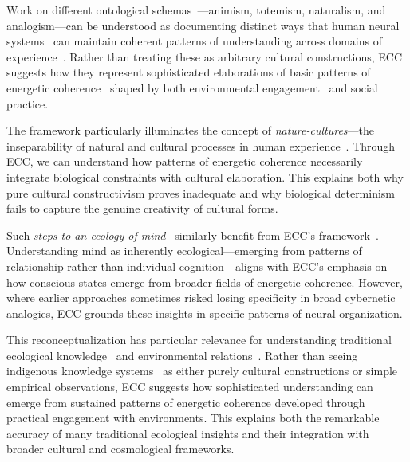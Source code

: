 Work on different ontological schemas~—animism, totemism, naturalism, and analogism—can be understood as documenting distinct ways that human neural systems~ can maintain coherent patterns of understanding across domains of experience~\cite{descola2013beyond,viveiros1998cosmological}. Rather than treating these as arbitrary cultural constructions, ECC suggests how they represent sophisticated elaborations of basic patterns of energetic coherence~ shaped by both environmental engagement~ and social practice.

The framework particularly illuminates the concept of \textit{nature-cultures}—the inseparability of natural and cultural processes in human experience~\cite{haraway2016staying,tsing2015mushroom}. Through ECC, we can understand how patterns of energetic coherence necessarily integrate biological constraints with cultural elaboration. This explains both why pure cultural constructivism proves inadequate and why biological determinism fails to capture the genuine creativity of cultural forms.

Such \textit{steps to an ecology of mind}~ similarly benefit from ECC's framework~\cite{bateson1972steps,hayles2017unthought}. Understanding mind as inherently ecological—emerging from patterns of relationship rather than individual cognition—aligns with ECC's emphasis on how conscious states emerge from broader fields of energetic coherence. However, where earlier approaches sometimes risked losing specificity in broad cybernetic analogies, ECC grounds these insights in specific patterns of neural organization.

This reconceptualization has particular relevance for understanding traditional ecological knowledge~ and environmental relations~\cite{ingold2011being,kohn2013how}. Rather than seeing indigenous knowledge systems~ as either purely cultural constructions or simple empirical observations, ECC suggests how sophisticated understanding can emerge from sustained patterns of energetic coherence developed through practical engagement with environments. This explains both the remarkable accuracy of many traditional ecological insights and their integration with broader cultural and cosmological frameworks.

